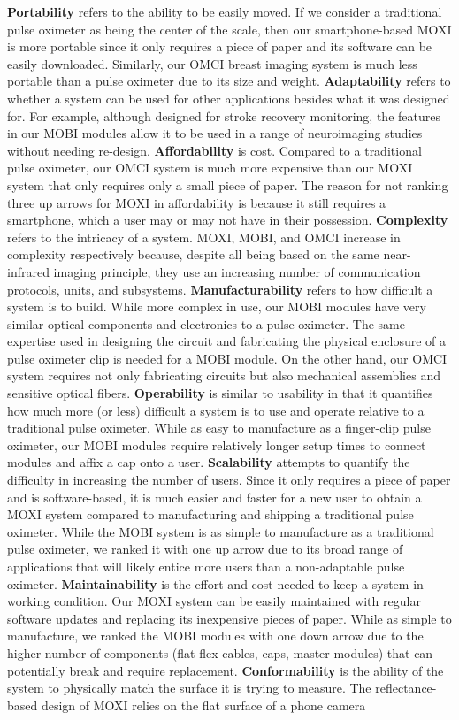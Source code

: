 \textbf{Portability} refers to the ability to be easily moved. If we consider a traditional pulse oximeter as being the center of the scale, then our smartphone-based \ac{MOXI} is more portable since it only requires a piece of paper and its software can be easily downloaded. Similarly, our \ac{OMCI} breast imaging system is much less portable than a pulse oximeter due to its size and weight. \textbf{Adaptability} refers to whether a system can be used for other applications besides what it was designed for. For example, although designed for stroke recovery monitoring, the features in our \ac{MOBI} modules allow it to be used in a range of neuroimaging studies without needing re-design. \textbf{Affordability} is cost. Compared to a traditional pulse oximeter, our \ac{OMCI} system is much more expensive than our \ac{MOXI} system that only requires only a small piece of paper. The reason for not ranking three up arrows for \ac{MOXI} in affordability is because it still requires a smartphone, which a user may or may not have in their possession. \textbf{Complexity} refers to the intricacy of a system. \ac{MOXI}, \ac{MOBI}, and \ac{OMCI} increase in complexity respectively because, despite all being based on the same near-infrared imaging principle, they use an increasing number of communication protocols, units, and subsystems. \textbf{Manufacturability} refers to how difficult a system is to build. While more complex in use, our \ac{MOBI} modules have very similar optical components and electronics to a pulse oximeter. The same expertise used in designing the circuit and fabricating the physical enclosure of a pulse oximeter clip is needed for a \ac{MOBI} module. On the other hand, our \ac{OMCI} system requires not only fabricating circuits but also mechanical assemblies and sensitive optical fibers. \textbf{Operability} is similar to usability in that it quantifies how much more (or less) difficult a system is to use and operate relative to a traditional pulse oximeter. While as easy to manufacture as a finger-clip pulse oximeter, our \ac{MOBI} modules require relatively longer setup times to connect modules and affix a cap onto a user. \textbf{Scalability} attempts to quantify the difficulty in increasing the number of users. Since it only requires a piece of paper and is software-based, it is much easier and faster for a new user to obtain a \ac{MOXI} system compared to manufacturing and shipping a traditional pulse oximeter.  While the \ac{MOBI} system is as simple to manufacture as a traditional pulse oximeter, we ranked it with one up arrow due to its broad range of applications that will likely entice more users than a non-adaptable pulse oximeter. \textbf{Maintainability} is the effort and cost needed to keep a system in working condition. Our \ac{MOXI} system can be easily maintained with regular software updates and replacing its inexpensive pieces of paper. While as simple to manufacture, we ranked the \ac{MOBI} modules with one down arrow due to the higher number of components (flat-flex cables, caps, master modules) that can potentially break and require replacement. \textbf{Conformability} is the ability of the system to physically match the surface it is trying to measure. The reflectance-based design of \ac{MOXI} relies on the flat surface of a phone camera 